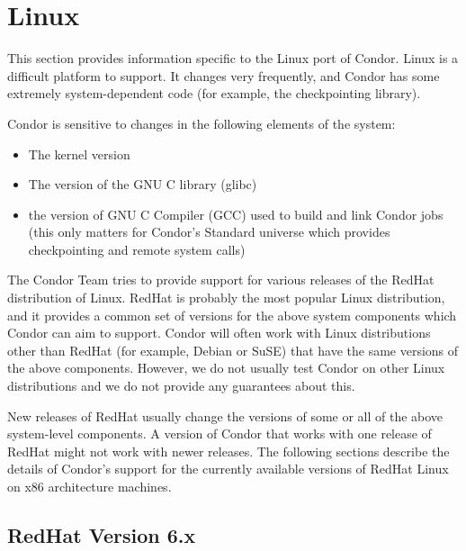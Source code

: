 \section{\label{sec:platform-linux}Linux}

This section provides information specific to the Linux port of
Condor.
Linux is a difficult platform to support.
It changes very frequently, and Condor has some extremely
system-dependent code (for example, the checkpointing library).

Condor is sensitive to changes in the following elements of the
system: 
\begin{itemize}
\item The kernel version
\item The version of the GNU C library (glibc)
\item the version of GNU C Compiler (GCC) used to build and link
  Condor jobs (this only matters for Condor's Standard universe which
  provides checkpointing and remote system calls)
\end{itemize}

The Condor Team tries to provide support for various releases of the
RedHat distribution of Linux.
RedHat is probably the most popular Linux distribution, and it
provides a common set of versions for the above system components
which Condor can aim to support.
Condor will often work with Linux distributions other than RedHat (for
example, Debian or SuSE) that have the same versions of the above
components.
However, we do not usually test Condor on other Linux distributions
and we do not provide any guarantees about this.

New releases of RedHat usually change the versions of some or all of
the above system-level components.
A version of Condor that works with one release of RedHat might not
work with newer releases.
The following sections describe the details of Condor's support for
the currently available versions of RedHat Linux on x86 architecture
machines.


\subsection{\label{sec:platform-linux-rh6}RedHat Version 6.x}

